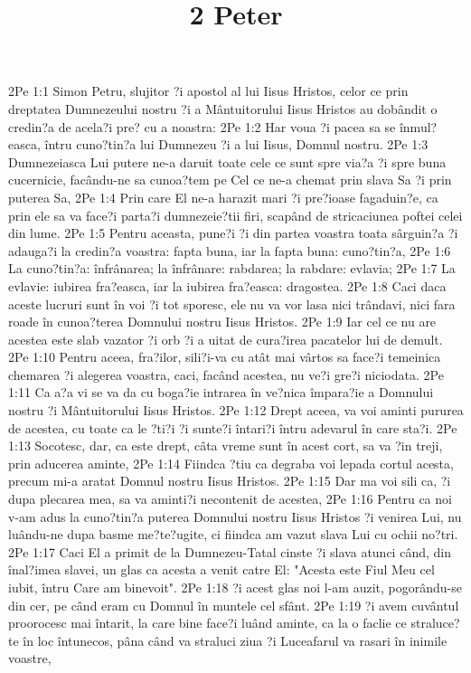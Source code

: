 

\title{2 Peter}

2Pe 1:1  Simon Petru, slujitor ?i apostol al lui Iisus Hristos, celor ce prin dreptatea Dumnezeului nostru ?i a Mântuitorului Iisus Hristos au dobândit o credin?a de acela?i pre? cu a noastra:
2Pe 1:2  Har voua ?i pacea sa se înmul?easca, întru cuno?tin?a lui Dumnezeu ?i a lui Iisus, Domnul nostru.
2Pe 1:3  Dumnezeiasca Lui putere ne-a daruit toate cele ce sunt spre via?a ?i spre buna cucernicie, facându-ne sa cunoa?tem pe Cel ce ne-a chemat prin slava Sa ?i prin puterea Sa,
2Pe 1:4  Prin care El ne-a harazit mari ?i pre?ioase fagaduin?e, ca prin ele sa va face?i parta?i dumnezeie?tii firi, scapând de stricaciunea poftei celei din lume.
2Pe 1:5  Pentru aceasta, pune?i ?i din partea voastra toata sârguin?a ?i adauga?i la credin?a voastra: fapta buna, iar la fapta buna: cuno?tin?a,
2Pe 1:6  La cuno?tin?a: înfrânarea; la înfrânare: rabdarea; la rabdare: evlavia;
2Pe 1:7  La evlavie: iubirea fra?easca, iar la iubirea fra?easca: dragostea.
2Pe 1:8  Caci daca aceste lucruri sunt în voi ?i tot sporesc, ele nu va vor lasa nici trândavi, nici fara roade în cunoa?terea Domnului nostru Iisus Hristos.
2Pe 1:9  Iar cel ce nu are acestea este slab vazator ?i orb ?i a uitat de cura?irea pacatelor lui de demult.
2Pe 1:10  Pentru aceea, fra?ilor, sili?i-va cu atât mai vârtos sa face?i temeinica chemarea ?i alegerea voastra, caci, facând acestea, nu ve?i gre?i niciodata.
2Pe 1:11  Ca a?a vi se va da cu boga?ie intrarea în ve?nica împara?ie a Domnului nostru ?i Mântuitorului Iisus Hristos.
2Pe 1:12  Drept aceea, va voi aminti pururea de acestea, cu toate ca le ?ti?i ?i sunte?i întari?i întru adevarul în care sta?i.
2Pe 1:13  Socotesc, dar, ca este drept, câta vreme sunt în acest cort, sa va ?in treji, prin aducerea aminte,
2Pe 1:14  Fiindca ?tiu ca degraba voi lepada cortul acesta, precum mi-a aratat Domnul nostru Iisus Hristos.
2Pe 1:15  Dar ma voi sili ca, ?i dupa plecarea mea, sa va aminti?i necontenit de acestea,
2Pe 1:16  Pentru ca noi v-am adus la cuno?tin?a puterea Domnului nostru Iisus Hristos ?i venirea Lui, nu luându-ne dupa basme me?te?ugite, ci fiindca am vazut slava Lui cu ochii no?tri.
2Pe 1:17  Caci El a primit de la Dumnezeu-Tatal cinste ?i slava atunci când, din înal?imea slavei, un glas ca acesta a venit catre El: "Acesta este Fiul Meu cel iubit, întru Care am binevoit".
2Pe 1:18  ?i acest glas noi l-am auzit, pogorându-se din cer, pe când eram cu Domnul în muntele cel sfânt.
2Pe 1:19  ?i avem cuvântul proorocesc mai întarit, la care bine face?i luând aminte, ca la o faclie ce straluce?te în loc întunecos, pâna când va straluci ziua ?i Luceafarul va rasari în inimile voastre,
